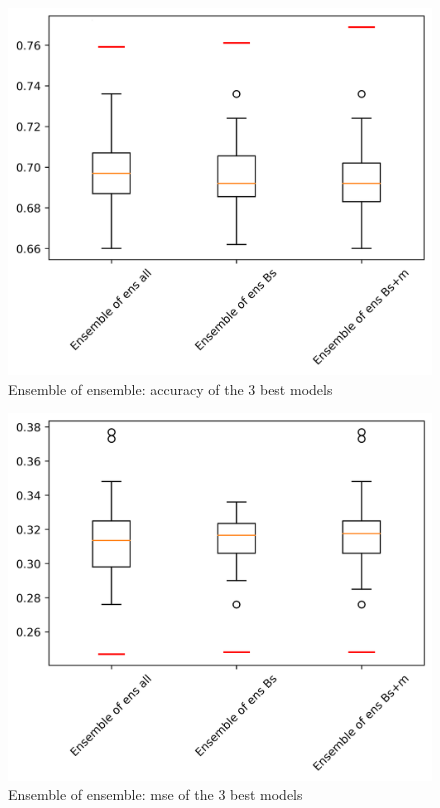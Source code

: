 \documentclass[10pt,letterpaper]{article}
\begin{document}
\begin{figure}[h!]
  \centering
  \begin{minipage}[b]{0.49\textwidth}
  \includegraphics[scale=0.2]{results/eoe_acc.png}
    \caption{Ensemble of ensemble: accuracy of the 3 best models}
   \label{marker5}
  \end{minipage}
  \hfill
\end{figure}

\begin{figure}[h!]
  \centering
  \begin{minipage}[b]{0.49\textwidth}
  \includegraphics[scale=0.2]{results/eoe_mse.png}
    \caption{Ensemble of ensemble: mse of the 3 best models}
   \label{marker5}
  \end{minipage}
  \hfill
\end{figure}
\end{document}
